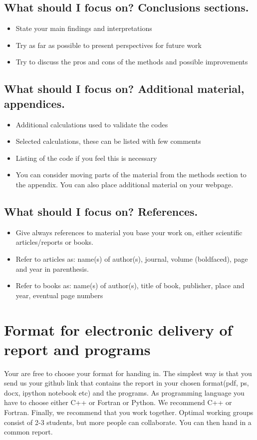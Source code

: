 \documentclass[10pt]{article}
\begin{document}
\subsection*{What should I focus on? Conclusions sections.}
\begin{itemize}
\item State your main findings and interpretations
\item Try as far as possible to present perspectives for future work
\item Try to discuss the pros and cons of the methods and possible improvements
\end{itemize}

\subsection*{What should I focus on? Additional material, appendices.}
\begin{itemize}
\item Additional calculations used to validate the codes
\item Selected calculations, these can be listed with few comments
\item Listing of the code if you feel this is necessary
\item You can consider moving parts of the material from the methods section to the appendix. You can also place additional material on your webpage.
\end{itemize}
\subsection*{What should I focus on? References.}
\begin{itemize}
\item Give always references to material you base your work on, either scientific articles/reports or books.
\item Refer to articles as: name(s) of author(s), journal, volume (boldfaced), page and year in parenthesis.
\item Refer to books as: name(s) of author(s), title of book, publisher, place and year, eventual page numbers
\end{itemize}



\section*{Format for electronic delivery of report and programs}
%
Your are free to choose your format for handing in. The simplest way is that you send us your github link that contains the report in your chosen format(pdf, ps, docx, ipython notebook etc) and the programs.
As programming language you have to choose either C++ or Fortran or Python. We recommend C++ or Fortran.
Finally, 
we recommend that you work together. Optimal working groups consist of 
2-3 students, but more people can collaborate. You can then hand in a common report. 
\end{document}
